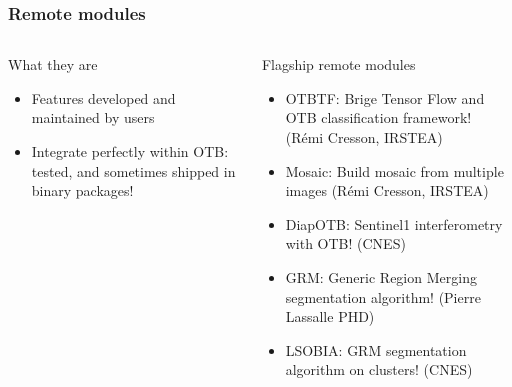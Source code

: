 \documentclass[8pt,aspectratio=169]{beamer}
\begin{document}
    \begin{frame}
    \frametitle{Remote modules}

    \begin{columns}
    \begin{block}{What they are}
      \begin{itemize}
      \item Features developed and maintained by users
      \item Integrate perfectly within OTB: tested, and sometimes shipped in binary packages!  
      \end{itemize}
    \end{block}
    
    \begin{block}{Flagship remote modules}
      \begin{itemize}
      \item OTBTF: Brige Tensor Flow and OTB classification framework! (Rémi Cresson, IRSTEA)
      \item Mosaic: Build mosaic from multiple images (Rémi Cresson, IRSTEA)
      \item DiapOTB: Sentinel1 interferometry with OTB! (CNES)
      \item GRM: Generic Region Merging segmentation algorithm! (Pierre Lassalle PHD)
      \item LSOBIA: GRM segmentation algorithm on clusters! (CNES)
        
      \end{itemize}
      

\end{block}
\end{columns}
\end{frame}
\end{document}
